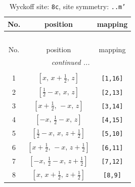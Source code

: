 \documentclass[fleqn,8pt]{jsarticle}
\begin{document}
\renewcommand{\arraystretch}{1.2}
\begin{longtable}{ccc}
\caption{Wyckoff site: {\tt 8c}, site symmetry: {\tt ..m'}}
 \\
 \hline \hline
No. & position & mapping \\ \hline \endfirsthead

\multicolumn{2}{l}{\tablename\ \thetable{}} \\
 \hline \hline
No. & position & mapping \\ \hline \endhead

 \hline \hline
\multicolumn{2}{r}{\footnotesize\it continued ...} \\ \endfoot

 \hline \hline
\multicolumn{2}{r}{} \\ \endlastfoot

1 & $\left[ x,\, x + \frac{1}{2},\, z \right]$ & {\tt [1,16]} \\ \hline
2 & $\left[ \frac{1}{2} - x,\, x,\, z \right]$ & {\tt [2,13]} \\ \hline
3 & $\left[ x + \frac{1}{2},\, - x,\, z \right]$ & {\tt [3,14]} \\ \hline
4 & $\left[ - x,\, \frac{1}{2} - x,\, z \right]$ & {\tt [4,15]} \\ \hline
5 & $\left[ \frac{1}{2} - x,\, x,\, z + \frac{1}{2} \right]$ & {\tt [5,10]} \\ \hline
6 & $\left[ x + \frac{1}{2},\, - x,\, z + \frac{1}{2} \right]$ & {\tt [6,11]} \\ \hline
7 & $\left[ - x,\, \frac{1}{2} - x,\, z + \frac{1}{2} \right]$ & {\tt [7,12]} \\ \hline
8 & $\left[ x,\, x + \frac{1}{2},\, z + \frac{1}{2} \right]$ & {\tt [8,9]} \\
\end{longtable}
\renewcommand{\arraystretch}{1.2}
\end{document}
